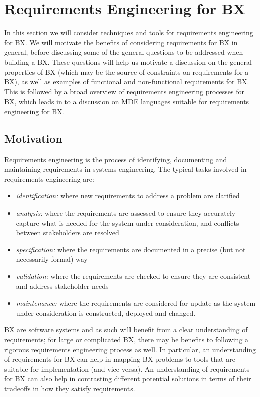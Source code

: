 \section{Requirements Engineering for BX}
\label{section:requirements}

In this section we will consider techniques and tools for requirements engineering for BX. We will motivate the benefits of considering requirements for BX in general, before discussing some of the general questions to be addressed when building a BX. These questions will help us motivate a discussion on the general properties of BX (which may be the source of constraints on requirements for a BX), as well as examples of functional and non-functional requirements for BX. This is followed by a broad overview of requirements engineering processes for BX, which leads in to a discussion on MDE languages suitable for requirements engineering for BX.

\subsection{Motivation}
Requirements engineering is the process of identifying, documenting and maintaining requirements in systems engineering. The typical tasks involved in requirements engineering are:
\begin{itemize}
\item \textit{identification:} where new requirements to address a problem are clarified
\item \textit{analysis:} where the requirements are assessed to ensure they accurately capture what is needed for the system under consideration, and conflicts between stakeholders are resolved
\item \textit{specification:} where the requirements are documented in a precise (but not necessarily formal) way
\item \textit{validation:} where the requirements are checked to ensure they are consistent and address stakeholder needs
\item \textit{maintenance:} where the requirements are considered for update as the system under consideration is constructed, deployed and changed.
\end{itemize}
BX are software systems and as such will benefit from a clear understanding of requirements; for large or complicated BX, there may be benefits to following a rigorous requirements engineering process as well. In particular, an understanding of requirements for BX can help in mapping BX problems to tools that are suitable for implementation (and vice versa). An understanding of requirements for BX can also help in contrasting different potential solutions in terms of their tradeoffs in how they satisfy requirements.  

